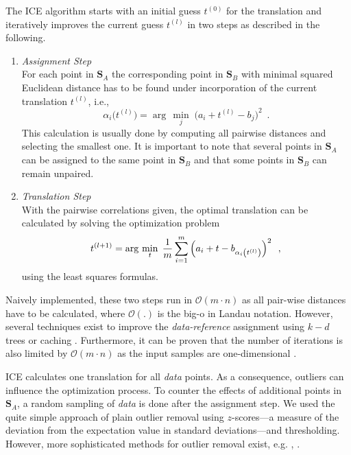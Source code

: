 \documentclass[conference]{IEEEtran}
\theoremstyle{examplestyle}
\begin{document}
The \ac{ICE} algorithm starts with an initial guess $t^{(0)}$ for the translation and iteratively improves the current guess $t^{(l)}$ in two steps as described in the following.

\begin{enumerate}
 \item \emph{Assignment Step}\\
For each point in \(\pmb{S}_A\) the corresponding point in \(\pmb{S}_B\) with minimal squared Euclidean distance has to be found under incorporation of the current translation $t^{(l)}$, i.e., 
\begin{equation}
\alpha_i\big(t^{(l)}\big)= \arg\,\min\limits_j \; \big(a_i+t^{(l)}-b_j\big)^2 \enspace .
\end{equation}
This calculation is usually done by computing all pairwise distances and selecting the smallest one. It is important to note that several points in \(\pmb{S}_A\) can be assigned to the same point in \(\pmb{S}_B\) and that some points in \(\pmb{S}_B\) can remain unpaired.



\item \emph{Translation Step}\\
With the pairwise correlations given, the optimal translation can be calculated by solving the optimization problem
\begin{equation}
t^{(l+1)}= \arg\,\min\limits_{t} \; \dfrac{1}{m} \sum_{i = 1}^{m} \left( a_i + t - b_{\alpha_i\left(t^{(l)}\right)} \right)^2 \enspace , \\
\end{equation}
using the least squares formulas.
 
\end{enumerate}




Naively implemented, these two steps run in \(\mathcal{O}(m \cdot n)\) as all pair-wise distances have to be calculated, where $\mathcal{O}(.)$ is the big-o in Landau notation. However, several techniques exist to improve the \textit{data-reference} assignment using \(k-d\) trees or caching \cite{Pomerleau2015}. Furthermore, it can be proven that the number of iterations is also limited by \(\mathcal{O}(m \cdot n)\) as the input samples are one-dimensional \cite{Ezra2008}.

\ac{ICE} calculates one translation for all \textit{data} points. As a consequence, outliers can influence the optimization process. To counter the effects of additional points in \(\pmb{S}_A\), a random sampling of \textit{data} is done after the assignment step. We used the quite simple approach of plain outlier removal using \(z\)-scores---a measure of the deviation from the expectation value in standard deviations---and thresholding.
However, more sophisticated methods for outlier removal exist, e.g. \cite{Hontani2012}, \cite{Phillips2007}.
\end{document}
